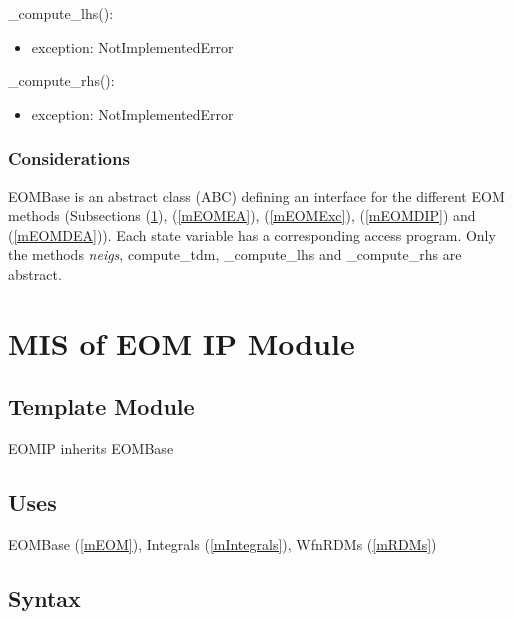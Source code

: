 \documentclass[12pt, titlepage]{article}
\begin{document}
\noindent \_compute\_lhs():
\begin{itemize}
	\item exception: NotImplementedError 
\end{itemize}

\noindent\_compute\_rhs():
\begin{itemize}
	\item exception: NotImplementedError 
\end{itemize}

\subsubsection{Considerations}
EOMBase is an abstract class (ABC) defining an interface for the 
different EOM methods (Subsections (\ref{mEOMIP}), (\ref{mEOMEA}), 
(\ref{mEOMExc}), (\ref{mEOMDIP}) and (\ref{mEOMDEA})). Each state variable has a 
corresponding access program. Only the methods \textit{neigs}, compute\_tdm, 
\_compute\_lhs and \_compute\_rhs are abstract.

\newpage

\section{MIS of EOM IP Module} \label{mEOMIP}

\subsection{Template Module}

EOMIP inherits EOMBase

\subsection{Uses}
EOMBase (\ref{mEOM}), Integrals (\ref{mIntegrals}), WfnRDMs (\ref{mRDMs})

\subsection{Syntax}
\end{document}
